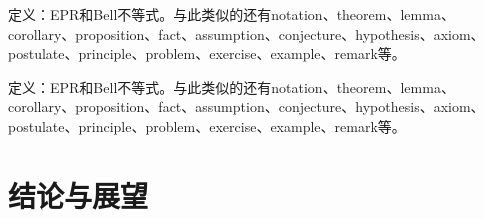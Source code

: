 \begin{definition}
定义：EPR和Bell不等式。与此类似的还有notation、theorem、lemma、corollary、proposition、fact、assumption、conjecture、hypothesis、axiom、postulate、principle、problem、exercise、example、remark等。
\end{definition}
\begin{theorem}
定义：EPR和Bell不等式。与此类似的还有notation、theorem、lemma、corollary、proposition、fact、assumption、conjecture、hypothesis、axiom、postulate、principle、problem、exercise、example、remark等。
\end{theorem}

\section{结论与展望}

\backmatter 



\appendixs{}%



\begin{acknowledgment}%



\end{acknowledgment}


  
